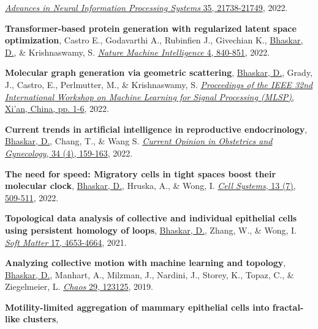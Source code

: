 \documentclass[margin,line]{res}
\begin{document}
\begin{resume}
{\begin{etaremune}[start=16]
\href{https://proceedings.neurips.cc/paper_files/paper/2022/hash/88438dc62fc5c8777e2b5f1b4f6d37a2-Abstract-Conference.html}{\textit{Advances in Neural Information Processing Systems} 35, 21738-21749}, 2022.
\vspace*{.1cm}
\item{\bf Transformer-based protein generation with regularized latent space optimization}, 
Castro E., Godavarthi A., Rubinfien J., Givechian K., \underline{Bhaskar, D.}, \& Krishnaswamy, S.
\href{https://www.nature.com/articles/s42256-022-00532-1}{\textit{Nature Machine Intelligence} 4, 840-851}, 2022.
\vspace*{.1cm}
\item{\bf Molecular graph generation via geometric scattering},
\underline{Bhaskar, D.}, Grady, J., Castro, E., Perlmutter, M., \& Krishnaswamy, S.
\href{https://doi.org/10.1109/MLSP55214.2022.9943379}{\textit{Proceedings of the IEEE 32nd International Workshop on Machine Learning for Signal Processing (MLSP)}, Xi'an, China, pp. 1-6}, 2022.
\vspace*{.1cm}
\item{\bf Current trends in artificial intelligence in reproductive endocrinology},
\underline{Bhaskar, D.}, Chang, T., \& Wang S.
\href{https://doi.org/10.1097/GCO.0000000000000796}{\textit{Current Opinion in Obstetrics and Gynecology}, 34 (4), 159-163}, 2022.
\vspace*{.1cm}
\item{\bf The need for speed: Migratory cells in tight spaces boost their molecular clock},
\underline{Bhaskar, D.}, Hruska, A., \& Wong, I.
\href{https://doi.org/10.1016/j.cels.2022.06.002}{\textit{Cell Systems}, 13 (7), 509-511}, 2022.
\vspace*{.1cm}
\item{\bf Topological data analysis of collective and individual epithelial cells using persistent homology of loops}, 
\underline{Bhaskar, D.}, Zhang, W., \& Wong, I. 
\href{https://doi.org/10.1039/D1SM00072A}{\textit{Soft Matter} 17, 4653-4664}, 2021.
\vspace*{.1cm}
\item{\bf Analyzing collective motion with machine learning and topology}, 
\underline{Bhaskar, D.}, Manhart, A., Milzman, J., Nardini, J., Storey, K., Topaz, C., \& Ziegelmeier, L. 
\href{https://aip.scitation.org/doi/10.1063/1.5125493}{\textit{Chaos} 29, 123125}, 2019.
\vspace*{.1cm}
\item{\bf Motility-limited aggregation of mammary epithelial cells into fractal-like clusters}, 

\end{etaremune}}
\end{resume}
\end{document}
